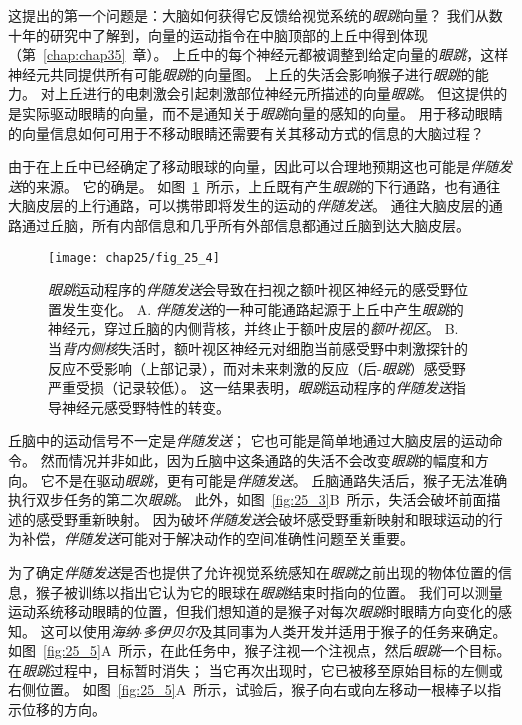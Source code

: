 这提出的第一个问题是：大脑如何获得它反馈给视觉系统的\textit{眼跳}向量？
我们从数十年的研究中了解到，向量的运动指令在中脑顶部的上丘中得到体现（第~\ref{chap:chap35}~章）。
上丘中的每个神经元都被调整到给定向量的\textit{眼跳}，这样神经元共同提供所有可能\textit{眼跳}的向量图。
上丘的失活会影响猴子进行\textit{眼跳}的能力。
对上丘进行的电刺激会引起刺激部位神经元所描述的向量\textit{眼跳}。 
但这提供的是实际驱动眼睛的向量，而不是通知关于\textit{眼跳}向量的感知的向量。
用于移动眼睛的向量信息如何可用于不移动眼睛还需要有关其移动方式的信息的大脑过程？


由于在上丘中已经确定了移动眼球的向量，因此可以合理地预期这也可能是\textit{伴随发送}的来源。
它的确是。
如图~\ref{fig:25_4}~所示，上丘既有产生\textit{眼跳}的下行通路，也有通往大脑皮层的上行通路，可以携带即将发生的运动的\textit{伴随发送}。
通往大脑皮层的通路通过丘脑，所有内部信息和几乎所有外部信息都通过丘脑到达大脑皮层。


\begin{figure}[htbp]
	\centering
	\texttt{[image: chap25/fig\_25\_4]}
	\caption{\textit{眼跳}运动程序的\textit{伴随发送}会导致在扫视之额叶视区神经元的感受野位置发生变化\cite{sommer2008brain}。
		A. \textit{伴随发送}的一种可能通路起源于上丘中产生\textit{眼跳}的神经元，穿过丘脑的内侧背核，并终止于额叶皮层的\textit{额叶视区}。
		B. 当\textit{背内侧核}失活时，额叶视区神经元对细胞当前感受野中刺激探针的反应不受影响（上部记录），而对未来刺激的反应（后-\textit{眼跳}）感受野严重受损（记录较低）。
		这一结果表明，\textit{眼跳}运动程序的\textit{伴随发送}指导神经元感受野特性的转变。}
	\label{fig:25_4}
\end{figure}


丘脑中的运动信号不一定是\textit{伴随发送}；
它也可能是简单地通过大脑皮层的运动命令。
然而情况并非如此，因为丘脑中这条通路的失活不会改变\textit{眼跳}的幅度和方向。
它不是在驱动\textit{眼跳}，更有可能是\textit{伴随发送}。
丘脑通路失活后，猴子无法准确执行双步任务的第二次\textit{眼跳}。
此外，如图~\ref{fig:25_3}B~所示，失活会破坏前面描述的感受野重新映射。
因为破坏\textit{伴随发送}会破坏感受野重新映射和眼球运动的行为补偿，\textit{伴随发送}可能对于解决动作的空间准确性问题至关重要。


为了确定\textit{伴随发送}是否也提供了允许视觉系统感知在\textit{眼跳}之前出现的物体位置的信息，猴子被训练以指出它认为它的眼球在\textit{眼跳}结束时指向的位置。
我们可以测量运动系统移动眼睛的位置，但我们想知道的是猴子对每次\textit{眼跳}时眼睛方向变化的感知。
这可以使用\textit{海纳$\cdot$多伊贝尔}及其同事为人类开发并适用于猴子的任务来确定。
如图~\ref{fig:25_5}A~所示，在此任务中，猴子注视一个注视点，然后\textit{眼跳}一个目标。
在\textit{眼跳}过程中，目标暂时消失；
当它再次出现时，它已被移至原始目标的左侧或右侧位置。
如图~\ref{fig:25_5}A~所示，试验后，猴子向右或向左移动一根棒子以指示位移的方向。


